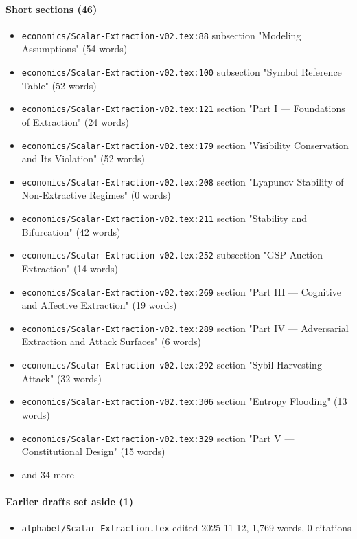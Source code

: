 \documentclass[11pt]{article}
\newcommand{\loc}[1]{{\small\color{muted}\texttt{#1}}}
\begin{document}
\paragraph{Short sections (46)}
\begin{itemize}
\item \loc{economics/\allowbreak{}Scalar-Extraction-v02.tex:88} subsection "Modeling Assumptions" (54 words)
\item \loc{economics/\allowbreak{}Scalar-Extraction-v02.tex:100} subsection "Symbol Reference Table" (52 words)
\item \loc{economics/\allowbreak{}Scalar-Extraction-v02.tex:121} section "Part I --- Foundations of Extraction" (24 words)
\item \loc{economics/\allowbreak{}Scalar-Extraction-v02.tex:179} section "Visibility Conservation and Its Violation" (52 words)
\item \loc{economics/\allowbreak{}Scalar-Extraction-v02.tex:208} section "Lyapunov Stability of Non-Extractive Regimes" (0 words)
\item \loc{economics/\allowbreak{}Scalar-Extraction-v02.tex:211} section "Stability and Bifurcation" (42 words)
\item \loc{economics/\allowbreak{}Scalar-Extraction-v02.tex:252} subsection "GSP Auction Extraction" (14 words)
\item \loc{economics/\allowbreak{}Scalar-Extraction-v02.tex:269} section "Part III --- Cognitive and Affective Extraction" (19 words)
\item \loc{economics/\allowbreak{}Scalar-Extraction-v02.tex:289} section "Part IV --- Adversarial Extraction and Attack Surfaces" (6 words)
\item \loc{economics/\allowbreak{}Scalar-Extraction-v02.tex:292} section "Sybil Harvesting Attack" (32 words)
\item \loc{economics/\allowbreak{}Scalar-Extraction-v02.tex:306} section "Entropy Flooding" (13 words)
\item \loc{economics/\allowbreak{}Scalar-Extraction-v02.tex:329} section "Part V --- Constitutional Design" (15 words)
\item[] {\color{muted}\small and 34 more}
\end{itemize}
\paragraph{Earlier drafts set aside (1)}
\begin{itemize}
\item \loc{alphabet/\allowbreak{}Scalar-Extraction.tex} edited 2025-11-12, 1,769 words, 0 citations
\end{itemize}
\end{document}
